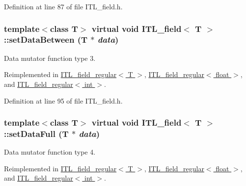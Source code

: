 Definition at line 87 of file ITL\_\-field.h.

\hypertarget{classITL__field_a4bbd5103c5298ac87eaac25c759a98c7}{
\subsubsection[{setDataBetween}]{\setlength{\rightskip}{0pt plus 5cm}template$<$class T$>$ virtual void {\bf ITL\_\-field}$<$ T $>$::setDataBetween (T $\ast$ {\em data})}}
\label{classITL__field_a4bbd5103c5298ac87eaac25c759a98c7}


Data mutator function type 3. 



Reimplemented in \hyperlink{classITL__field__regular_a07a0497a570f77755528aa9fc1e50934}{ITL\_\-field\_\-regular$<$ T $>$}, \hyperlink{classITL__field__regular_a07a0497a570f77755528aa9fc1e50934}{ITL\_\-field\_\-regular$<$ float $>$}, and \hyperlink{classITL__field__regular_a07a0497a570f77755528aa9fc1e50934}{ITL\_\-field\_\-regular$<$ int $>$}.



Definition at line 95 of file ITL\_\-field.h.

\hypertarget{classITL__field_a0c32994fe56253d8c7111d670742afc1}{
\subsubsection[{setDataFull}]{\setlength{\rightskip}{0pt plus 5cm}template$<$class T$>$ virtual void {\bf ITL\_\-field}$<$ T $>$::setDataFull (T $\ast$ {\em data})}}
\label{classITL__field_a0c32994fe56253d8c7111d670742afc1}


Data mutator function type 4. 



Reimplemented in \hyperlink{classITL__field__regular_aff339caac0e4e04156553b6b1c194fea}{ITL\_\-field\_\-regular$<$ T $>$}, \hyperlink{classITL__field__regular_aff339caac0e4e04156553b6b1c194fea}{ITL\_\-field\_\-regular$<$ float $>$}, and \hyperlink{classITL__field__regular_aff339caac0e4e04156553b6b1c194fea}{ITL\_\-field\_\-regular$<$ int $>$}.




